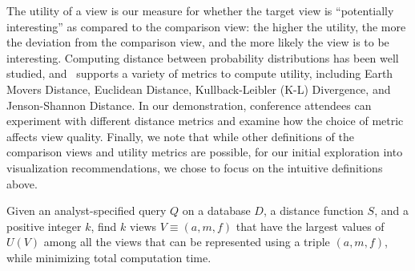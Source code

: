 The utility of a view is our measure for whether the target view is
``potentially interesting'' as compared to the comparison view:
the higher the utility, the more the deviation
from the comparison view, and the more likely the view is to be interesting.
Computing distance between probability distributions has
been well studied, and \VizRecDB\ supports a variety of metrics
to compute utility, including Earth Movers Distance, 
Euclidean Distance, Kullback-Leibler (K-L) Divergence, and Jenson-Shannon
Distance. 
In our demonstration, conference attendees can experiment with
different distance metrics and examine how the choice of metric affects view
quality.
Finally, we note that while other definitions of the comparison views and
utility metrics are possible, for our initial exploration into 
visualization recommendations, we chose to focus on the intuitive definitions above.
\begin{problem}
\vspace{-5pt}
Given an analyst-specified query $Q$ on a database $D$, a distance function $S$,
and a positive integer $k$, find $k$ views $V \equiv (a, m, f)$ that
have the largest values of $U(V)$ among all the views that can be represented
using a triple $(a, m, f)$, while minimizing total computation time.
\vspace{-5pt}
\end{problem}


